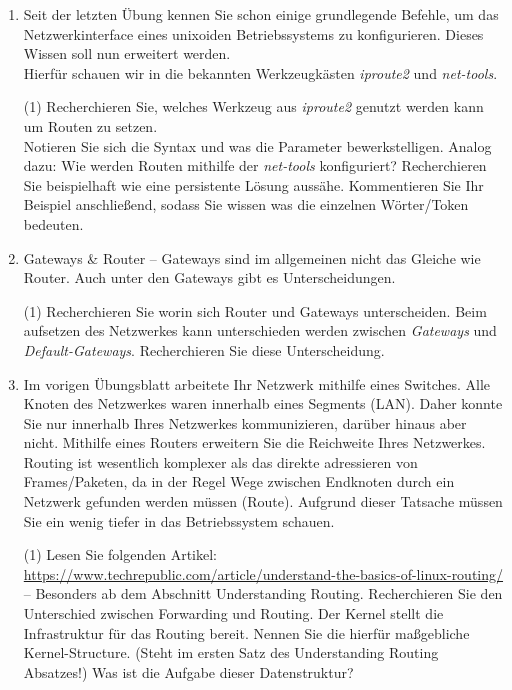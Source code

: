 \documentclass[paper=a4,fontsize=11pt]{scrartcl}%
\numberwithin{equation}{section}
\begin{document}
\begin{enumerate}
	\item Seit der letzten Übung kennen Sie schon einige grundlegende Befehle, um das Netzwerkinterface eines unixoiden Betriebssystems zu konfigurieren. Dieses Wissen soll nun erweitert werden.\\
	Hierfür schauen wir in die bekannten Werkzeugkästen \emph{iproute2} und \emph{net-tools}.
	\begin{tasks}(1)
		\task Recherchieren Sie, welches Werkzeug aus \emph{iproute2} genutzt werden kann um Routen zu setzen.\\
		Notieren Sie sich die Syntax und was die Parameter bewerkstelligen.
		\task Analog dazu: Wie werden Routen mithilfe der \emph{net-tools} konfiguriert?
		\task Recherchieren Sie beispielhaft wie eine persistente Lösung aussähe. Kommentieren Sie 
		Ihr Beispiel anschließend, sodass Sie wissen was die einzelnen Wörter/Token bedeuten.
	\end{tasks}
	\item Gateways \& Router -- Gateways sind im allgemeinen nicht das Gleiche wie Router. Auch unter den Gateways gibt es Unterscheidungen.
	\begin{tasks}(1)
		\task Recherchieren Sie worin sich Router und Gateways unterscheiden.
		\task Beim aufsetzen des Netzwerkes kann unterschieden werden zwischen \emph{Gateways} und \emph{Default-Gateways}. Recherchieren Sie diese Unterscheidung.
	\end{tasks}
	\item Im vorigen Übungsblatt arbeitete Ihr Netzwerk mithilfe eines Switches. Alle Knoten des Netzwerkes waren innerhalb eines Segments (LAN). Daher konnte Sie nur innerhalb Ihres Netzwerkes kommunizieren, darüber hinaus aber nicht. Mithilfe eines Routers erweitern Sie die Reichweite Ihres Netzwerkes.\\ 
	Routing ist wesentlich komplexer als das direkte adressieren von Frames/Paketen, da in der Regel Wege zwischen Endknoten durch ein Netzwerk gefunden werden müssen (Route). Aufgrund dieser Tatsache müssen Sie ein wenig tiefer in das Betriebssystem schauen.
	\begin{tasks}(1)
	\task Lesen Sie folgenden Artikel: \url{https://www.techrepublic.com/article/understand-the-basics-of-linux-routing/} -- Besonders ab dem Abschnitt \glqq Understanding Routing\grqq.
	\task Recherchieren Sie den Unterschied zwischen Forwarding und Routing.
	\task Der Kernel stellt die Infrastruktur für das Routing bereit. Nennen Sie die hierfür maßgebliche Kernel-Structure. (Steht im ersten Satz des Understanding Routing Absatzes!) Was ist die Aufgabe dieser Datenstruktur?

\end{tasks}
\end{enumerate}
\end{document}
